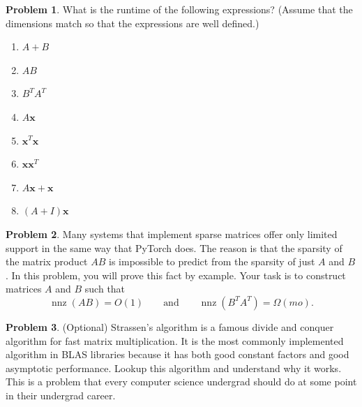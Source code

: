 \documentclass[10pt]{article}
\theoremstyle{definition}
\newtheorem{problem}{Problem}
\DeclareMathOperator{\nnz}{nnz}
\newcommand{\trans}[1]{{#1}^{T}}
\newcommand{\x}{\mathbf x}
\begin{document}
\begin{problem}
    What is the runtime of the following expressions?
    (Assume that the dimensions match so that the expressions are well defined.)

    \begin{enumerate}
        \item
            $A + B$
            \vspace{1in}
        \item
            $AB$
            \vspace{1in}
        \item
            $\trans B \trans A$
            \vspace{1in}
        \item
            $A\x$
            \vspace{1in}
        \item
            $\trans \x \x$
            \vspace{1in}
        \item
            $\x\trans \x$
            \vspace{1in}
        \item
            $A\x + \x$
            \vspace{1in}
        \item
            $(A+I)\x$
            \vspace{1in}
    \end{enumerate}
\end{problem}

\newpage
\begin{problem}
    Many systems that implement sparse matrices offer only limited support in the same way that PyTorch does.
    The reason is that the sparsity of the matrix product $AB$ is impossible to predict from the sparsity of just $A$ and $B$.
    In this problem, you will prove this fact by example.
    Your task is to construct matrices $A$ and $B$ such that
    \begin{equation}
        \nnz(AB) = O(1)
        \qquad
        \text{and}
        \qquad
        \nnz(\trans B \trans A) = \Omega(mo)
        .
    \end{equation}
    \vspace{3in}
\end{problem}

\begin{problem}
    (Optional)
    Strassen's algorithm is a famous divide and conquer algorithm for fast matrix multiplication.
    It is the most commonly implemented algorithm in BLAS libraries because it has both good constant factors and good asymptotic performance.
    Lookup this algorithm and understand why it works.
    This is a problem that every computer science undergrad should do at some point in their undergrad career.
    \vspace{4in}
\end{problem}
\end{document}
